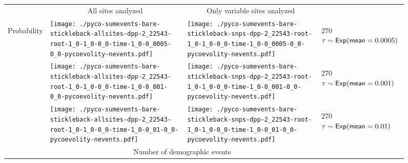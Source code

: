 \documentclass[border=10pt,varwidth=30cm]{standalone}
\begin{document}
\begin{figure}
    \centering
    \begin{tabular}{@{}llll@{}}
        & \multicolumn{1}{c}{\large All sites analyzed} & \multicolumn{1}{c}{\large Only variable sites analyzed} & \\[1ex]
        \multirow{2}{*}[-4em]{\begin{sideways}\large Probability\end{sideways}}
        & \texttt{[image: ./pyco-sumevents-bare-stickleback-allsites-dpp-2\_22543-root-1\_0-1\_0-0\_0-time-1\_0-0\_0005-0\_0-pycoevolity-nevents.pdf]}
        & \texttt{[image: ./pyco-sumevents-bare-stickleback-snps-dpp-2\_22543-root-1\_0-1\_0-0\_0-time-1\_0-0\_0005-0\_0-pycoevolity-nevents.pdf]}
        & \multirow{1}{*}[11.5em]{\begin{rotate}{270}$\tau \sim \textrm{\sffamily Exp}(\textrm{\sffamily mean}=0.0005)$\end{rotate}} \\
        & \texttt{[image: ./pyco-sumevents-bare-stickleback-allsites-dpp-2\_22543-root-1\_0-1\_0-0\_0-time-1\_0-0\_001-0\_0-pycoevolity-nevents.pdf]}
        & \texttt{[image: ./pyco-sumevents-bare-stickleback-snps-dpp-2\_22543-root-1\_0-1\_0-0\_0-time-1\_0-0\_001-0\_0-pycoevolity-nevents.pdf]}
        & \multirow{1}{*}[11em]{\begin{rotate}{270}$\tau \sim \textrm{\sffamily Exp}(\textrm{\sffamily mean}=0.001)$\end{rotate}} \\
        & \texttt{[image: ./pyco-sumevents-bare-stickleback-allsites-dpp-2\_22543-root-1\_0-1\_0-0\_0-time-1\_0-0\_01-0\_0-pycoevolity-nevents.pdf]}
        & \texttt{[image: ./pyco-sumevents-bare-stickleback-snps-dpp-2\_22543-root-1\_0-1\_0-0\_0-time-1\_0-0\_01-0\_0-pycoevolity-nevents.pdf]}
        & \multirow{1}{*}[11em]{\begin{rotate}{270}$\tau \sim \textrm{\sffamily Exp}(\textrm{\sffamily mean}=0.01)$\end{rotate}} \\
        & \multicolumn{2}{c}{\large Number of demographic events} & 
    \end{tabular}
\end{figure}
\end{document}
